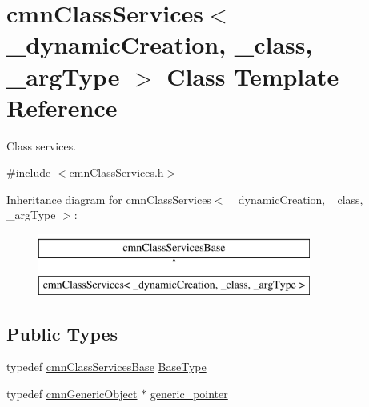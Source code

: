 \hypertarget{classcmn_class_services}{}\section{cmn\+Class\+Services$<$ \+\_\+dynamic\+Creation, \+\_\+class, \+\_\+arg\+Type $>$ Class Template Reference}
\label{classcmn_class_services}


Class services.  




{\ttfamily \#include $<$cmn\+Class\+Services.\+h$>$}

Inheritance diagram for cmn\+Class\+Services$<$ \+\_\+dynamic\+Creation, \+\_\+class, \+\_\+arg\+Type $>$\+:\begin{figure}[H]
\begin{center}
\leavevmode
\includegraphics[height=2.000000cm]{d4/d17/classcmn_class_services}
\end{center}
\end{figure}
\subsection*{Public Types}
\begin{DoxyCompactItemize}
\item 
typedef \hyperlink{classcmn_class_services_base}{cmn\+Class\+Services\+Base} \hyperlink{classcmn_class_services_a0c7e37600cf4dfa19bc34abe57cb13ea}{Base\+Type}
\item 
typedef \hyperlink{classcmn_generic_object}{cmn\+Generic\+Object} $\ast$ \hyperlink{classcmn_class_services_a350752158d6ffa3f741bcef03177f230}{generic\+\_\+pointer}
\end{DoxyCompactItemize}
